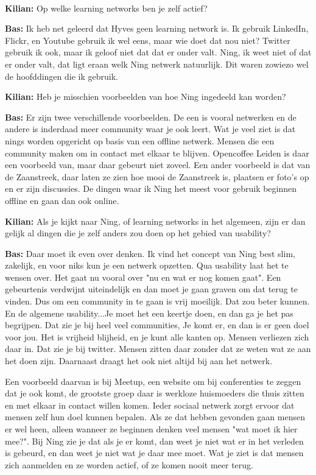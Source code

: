 \paragraph{}
\textbf{Kilian:} Op welke learning networks ben je zelf actief?

\textbf{Bas:} Ik heb net geleerd dat Hyves geen learning network is. Ik gebruik LinkedIn, Flickr, en Youtube gebruik ik wel eens, maar wie doet dat nou niet? Twitter gebruik ik ook, maar ik geloof niet dat dat er onder valt. Ning, ik weet niet of dat er onder valt, dat ligt eraan welk Ning netwerk natuurlijk. Dit waren zowiezo wel de hoofddingen die ik gebruik.

\textbf{Kilian:} Heb je misschien voorbeelden van hoe Ning ingedeeld kan worden?

\textbf{Bas:} Er zijn twee verschillende voorbeelden. De een is vooral netwerken en de andere is inderdaad meer community waar je ook leert. Wat je veel ziet is dat nings worden opgericht op basis van een offline netwerk. Mensen die een community maken om in contact met elkaar te blijven. Opencoffee Leiden is daar een voorbeeld van, maar daar gebeurt niet zoveel. Een ander voorbeeld is dat van de Zaanstreek, daar laten ze zien hoe mooi de Zaanstreek is, plaatsen er foto's op en er zijn discussies. De dingen waar ik Ning het meest voor gebruik beginnen offline en gaan dan ook online.

\textbf{Kilian:} Als je kijkt naar Ning, of learning networks in het algemeen, zijn er dan gelijk al dingen die je zelf anders zou doen op het gebied van usability?

\textbf{Bas:} Daar moet ik even over denken. Ik vind het concept van Ning best slim, zakelijk, en voor niks kun je een netwerk opzetten. Qua usability laat het te wensen over. Het gaat nu vooral over "nu en wat er nog komen gaat". Een gebeurtenis verdwijnt uiteindelijk en dan moet je gaan graven om dat terug te vinden. Dus om een community in te gaan is vrij moeilijk. Dat zou beter kunnen. En de algemene usability...Je moet het een keertje doen, en dan ga je het pas begrijpen. Dat zie je bij heel veel communities, Je komt er, en dan is er geen doel voor jou. Het is vrijheid blijheid, en je kunt alle kanten op. Mensen verliezen zich daar in. Dat zie je bij twitter. Mensen zitten daar zonder dat ze weten wat ze aan het doen zijn. Daarnaast draagt het ook niet altijd bij aan het netwerk.

Een voorbeeld daarvan is bij Meetup, een website om bij conferenties te zeggen dat je ook komt, de grootste groep daar is werkloze huismoeders die thuis zitten en met elkaar in contact willen komen. Ieder sociaal netwerk zorgt ervoor dat mensen zelf hun doel kunnen bepalen. Als ze dat hebben gevonden gaan mensen er wel heen, alleen wanneer ze beginnen denken veel mensen "wat moet ik hier mee?". Bij Ning zie je dat als je er komt, dan weet je niet wat er in het verleden is gebeurd, en dan weet je niet wat je daar mee moet. Wat je ziet is dat mensen zich aanmelden en ze worden actief, of ze komen nooit meer terug.

